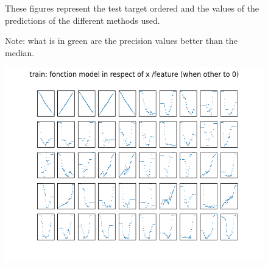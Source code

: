 \documentclass{article}
\begin{document}
\begin{figure}
These figures represent the test target ordered and the values ​​of the predictions of the different methods used.

Note: what is in green are the precision values ​​better than the median.

\end{figure}

\newpage


\begin{figure}
\includegraphics[scale=1]{train_affichage_fonction.png}
\end{figure}

\newpage
\end{document}
